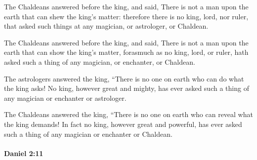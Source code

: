			The Chaldeans answered before the king, and said, There is not a man upon the earth that can shew the king’s matter: therefore there is no king, lord, nor ruler, that asked such things at any magician, or astrologer, or Chaldean.

			\begin{versebox}
					\item[BHS] 
					\item[LXX] 
					\item[ASV] The Chaldeans answered before the king, and said, There is not a man upon the earth that can show the king's matter, forasmuch as no king, lord, or ruler, hath asked such a thing of any magician, or enchanter, or Chaldean.
					\item[NIV] The astrologers answered the king, “There is no one on earth who can do what the king asks! No king, however great and mighty, has ever asked such a thing of any magician or enchanter or astrologer.
					\item[NRSV] The Chaldeans answered the king, “There is no one on earth who can reveal what the king demands! In fact no king, however great and powerful, has ever asked such a thing of any magician or enchanter or Chaldean.
			\end{versebox}

		\paragraph{Daniel 2:11} %
			\label{DANIEL-2-11}


